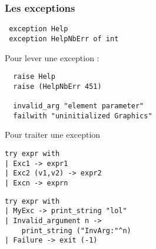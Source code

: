 \begin{frame}[fragile]
	\frametitle{Les exceptions}
	\begin{lstlisting}
 exception Help
 exception HelpNbErr of int
	\end{lstlisting}
	\begin{block}{Pour lever une exception :}
		\begin{lstlisting}
  raise Help
  raise (HelpNbErr 451)

  invalid_arg "element parameter"
  failwith "uninitialized Graphics"
		\end{lstlisting}
	\end{block}
	\begin{block}{Pour traiter une exception}
		\begin{center}
			\begin{minipage}{4.2cm}
				\lstset{basicstyle=\scriptsize}
				\begin{lstlisting}
try expr with
| Exc1 -> expr1
| Exc2 (v1,v2) -> expr2
| Excn -> exprn
				\end{lstlisting}
			\end{minipage}
			\begin{minipage}{5cm}
				\lstset{basicstyle=\scriptsize}
				\begin{lstlisting}
try expr with
| MyExc -> print_string "lol"
| Invalid_argument n ->
    print_string ("InvArg:"^n)
| Failure -> exit (-1)
				\end{lstlisting}
			\end{minipage}
		\end{center}
	\end{block}
\end{frame}
